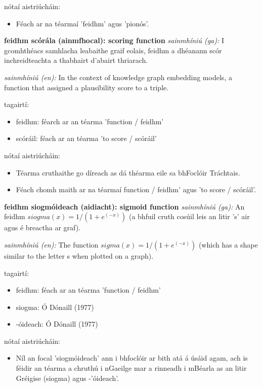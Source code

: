 \documentclass{article}
\begin{document}
nótaí aistriúcháin:
\begin{itemize}
	\item Féach ar na téarmaí 'feidhm' agus 'pionós'.
\end{itemize}


\textbf{feidhm scórála (ainmfhocal): scoring function}
\textit{sainmhíniú (ga):} I gcomhthéacs samhlacha leabaithe graif eolais, feidhm a dhéanann scór inchreidteachta a thabhairt d'abairt thriarach.

\textit{sainmhíniú (en):} In the context of knowledge graph embedding models, a function that assigned a plausibility score to a triple.

tagairtí:
\begin{itemize}
	\item feidhm: féarch ar an téarma 'function / feidhm'
	\item scóráil: féach ar an téarma 'to score / scóráil'
\end{itemize}

nótaí aistriúcháin:
\begin{itemize}
	\item Téarma cruthaithe go díreach as dá théarma eile sa bhFoclóir Tráchtais.
	\item Féach chomh maith ar na téarmaí function / feidhm' agus 'to score / scóráil'.
\end{itemize}


\textbf{feidhm siogmóideach (aidiacht): sigmoid function}
\textit{sainmhíniú (ga):} An feidhm $siogma(x) = 1 / (1 + e^(-x))$ (a bhfuil cruth cosúil leis an litir 's' air agus é breactha ar graf).

\textit{sainmhíniú (en):} The function $sigma(x) = 1 / (1 + e^(-x))$ (which has a shape similar to the letter s when plotted on a graph).

tagairtí:
\begin{itemize}
	\item feidhm: féach ar an téarma 'function / feidhm'
	\item siogma: Ó Dónaill (1977) \cite{odonaill}
	\item -óideach: Ó Dónaill (1977) \cite{odonaill}
\end{itemize}

nótaí aistriúcháin:
\begin{itemize}
	\item Níl an focal 'siogmóideach' ann i bhfoclóir ar bith atá á úsáid agam, ach is féidir an téarma a chruthú i nGaeilge mar a rinneadh i mBéarla as an litir Gréigise (siogma) agus -'óideach'.
\end{itemize}
\end{document}
